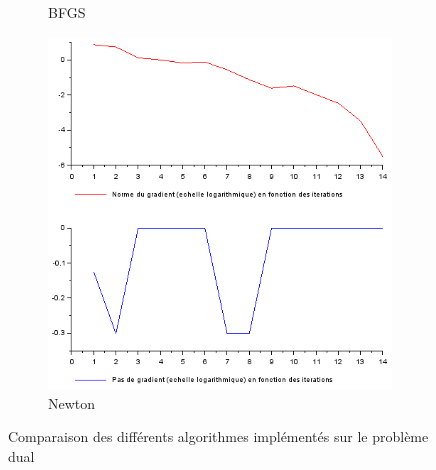 \documentclass{article}
\begin{document}
\begin{figure}
\begin{subfigure}[t]{.4\textwidth}
                \caption{BFGS}
                \label{fig:BFGS_dual}
            \end{subfigure}
            \hfill
            \begin{subfigure}[t]{.4\textwidth}
                \includegraphics[width=\textwidth]{../Images/Newton_dual.png}
                \caption{Newton}
                \label{fig:Newton_dual}
            \end{subfigure}
            \caption{Comparaison des différents algorithmes implémentés sur le problème dual}
            \label{fig:courbes_dual}
        \end{figure}
\end{document}
